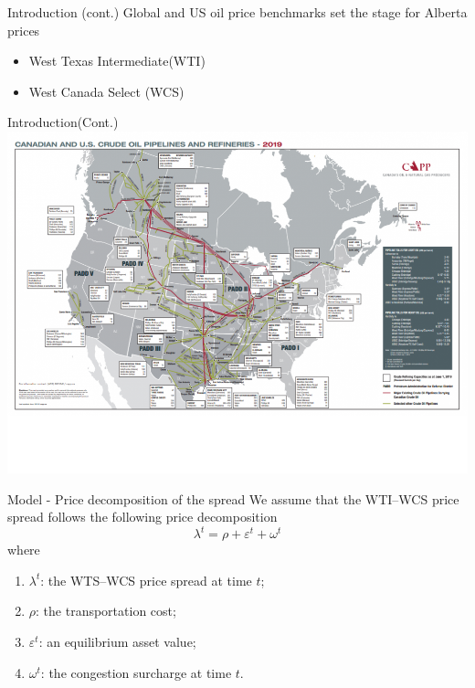 \documentclass[aspectratio = 169]{beamer}
\begin{document}
\begin{frame}{Introduction (cont.)}
\Large{Global and US oil price benchmarks set the stage for Alberta prices }
    \begin{itemize}
\setlength\itemsep{2em}
    \item \Large{West Texas Intermediate(WTI)}
    \item \Large{West Canada Select (WCS)}
\end{itemize}
\end{frame}

\begin{frame}{Introduction(Cont.)}
\centering
\includegraphics[scale=0.50]{OM-images/piplines.png}
\end{frame}



\begin{frame}{Model - Price decomposition of the spread}
We assume that the WTI--WCS price spread follows the following price decomposition
    \[\lambda^{t} = \rho + \varepsilon^{t} + \omega^{t}\]
where
\begin{enumerate}
    \item $\lambda^{t}$: the WTS--WCS price spread at time $t$;
    \item $\rho$: the transportation cost;
    \item $\varepsilon^{t}$: an equilibrium asset value;
    \item $\omega^{t}$: the congestion surcharge at time $t$.
\end{enumerate}
\end{frame}
\end{document}
